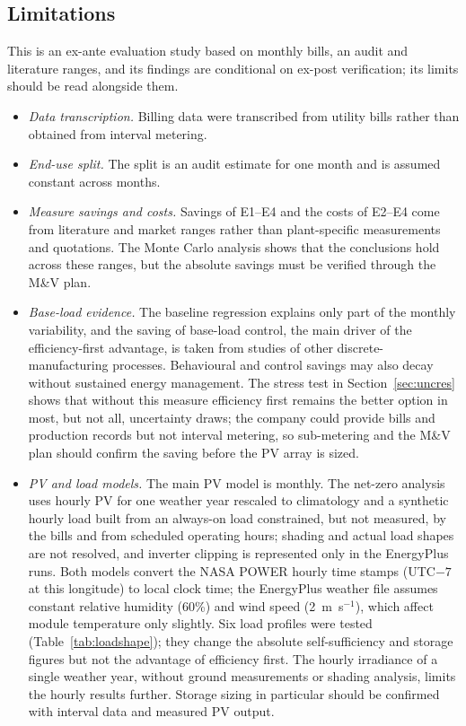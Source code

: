 \documentclass[processes,article,submit,pdftex,moreauthors]{Definitions/mdpi}
\begin{document}
\subsection{Limitations}
This is an ex-ante evaluation study based on monthly bills, an audit and literature ranges, and its findings are conditional on ex-post verification; its limits should be read alongside them.
\begin{itemize}
\item \emph{Data transcription.} Billing data were transcribed from utility bills rather than obtained from interval metering.
\item \emph{End-use split.} The split is an audit estimate for one month and is assumed constant across months.
\item \emph{Measure savings and costs.} Savings of E1--E4 and the costs of E2--E4 come from literature and market ranges rather than plant-specific measurements and quotations. The Monte Carlo analysis shows that the conclusions hold across these ranges, but the absolute savings must be verified through the M\&V plan.
\item \emph{Base-load evidence.} The baseline regression explains only part of the monthly variability, and the saving of base-load control, the main driver of the efficiency-first advantage, is taken from studies of other discrete-manufacturing processes. Behavioural and control savings may also decay without sustained energy management. The stress test in Section~\ref{sec:uncres} shows that without this measure efficiency first remains the better option in most, but not all, uncertainty draws; the company could provide bills and production records but not interval metering, so sub-metering and the M\&V plan should confirm the saving before the PV array is sized.
\item \emph{PV and load models.} The main PV model is monthly. The net-zero analysis uses hourly PV for one weather year rescaled to climatology and a synthetic hourly load built from an always-on load constrained, but not measured, by the bills and from scheduled operating hours; shading and actual load shapes are not resolved, and inverter clipping is represented only in the EnergyPlus runs. Both models convert the NASA POWER hourly time stamps (UTC$-7$ at this longitude) to local clock time; the EnergyPlus weather file assumes constant relative humidity (60\%) and wind speed (2~m~s$^{-1}$), which affect module temperature only slightly. Six load profiles were tested (Table~\ref{tab:loadshape}); they change the absolute self-sufficiency and storage figures but not the advantage of efficiency first. The hourly irradiance of a single weather year, without ground measurements or shading analysis, limits the hourly results further. Storage sizing in particular should be confirmed with interval data and measured PV output.

\end{itemize}
\end{document}
